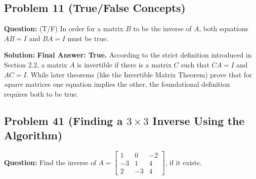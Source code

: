 \documentclass[12pt]{article}
\begin{document}
\subsection{Problem 11 (True/False Concepts)}
\textbf{Question:} (T/F) In order for a matrix $B$ to be the inverse of $A$, both equations $AB = I$ and $BA = I$ must be true.

\textbf{Solution:}
\textbf{Final Answer: True.} According to the strict definition introduced in Section 2.2, a matrix $A$ is invertible if there is a matrix $C$ such that $CA = I$ and $AC = I$. While later theorems (like the Invertible Matrix Theorem) prove that for \textit{square} matrices one equation implies the other, the foundational definition requires both to be true.

\subsection{Problem 41 (Finding a $3 \times 3$ Inverse Using the Algorithm)}
\textbf{Question:} Find the inverse of $A = \begin{bmatrix} 1 & 0 & -2 \\ -3 & 1 & 4 \\ 2 & -3 & 4 \end{bmatrix}$, if it exists.
\end{document}
